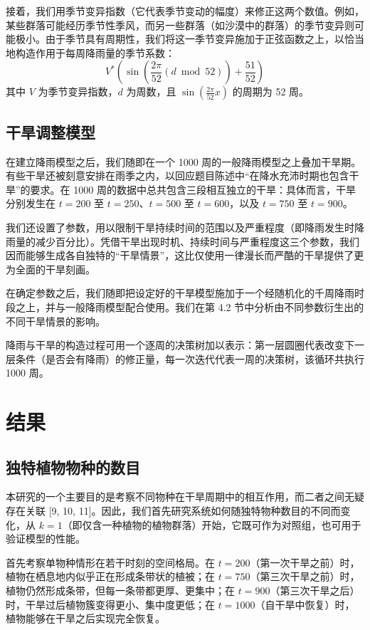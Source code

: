 \documentclass[11pt,a4paper]{ctexart}
\begin{document}
接着，我们用季节变异指数（它代表季节变动的幅度）来修正这两个数值。例如，某些群落可能经历季节性季风，而另一些群落（如沙漠中的群落）的季节变异则可能极小。由于季节具有周期性，我们将这一季节变异施加于正弦函数之上，以恰当地构造作用于每周降雨量的季节系数：
\[
V^{*}\left(\sin\left(\frac{2\pi}{52}\left(d \bmod 52\right)\right) + \frac{51}{52}\right)
\]
其中 $V$ 为季节变异指数，$d$ 为周数，且 $\sin\left(\frac{2\pi}{52}x\right)$ 的周期为 52 周。

\subsection{干旱调整模型}

在建立降雨模型之后，我们随即在一个 1000 周的一般降雨模型之上叠加干旱期。有些干旱还被刻意安排在雨季之内，以回应题目陈述中“在降水充沛时期也包含干旱”的要求。在 1000 周的数据中总共包含三段相互独立的干旱：具体而言，干旱分别发生在 $t=200$ 至 $t=250$、$t=500$ 至 $t=600$，以及 $t=750$ 至 $t=900$。

我们还设置了参数，用以限制干旱持续时间的范围以及严重程度（即降雨发生时降雨量的减少百分比）。凭借干旱出现时机、持续时间与严重程度这三个参数，我们因而能够生成各自独特的“干旱情景”，这比仅使用一律漫长而严酷的干旱提供了更为全面的干旱刻画。

在确定参数之后，我们随即把设定好的干旱模型施加于一个经随机化的千周降雨时段之上，并与一般降雨模型配合使用。我们在第 4.2 节中分析由不同参数衍生出的不同干旱情景的影响。

降雨与干旱的构造过程可用一个逐周的决策树加以表示：第一层圆圈代表改变下一层条件（是否会有降雨）的修正量，每一次迭代代表一周的决策树，该循环共执行 1000 周。

\section{结果}

\subsection{独特植物物种的数目}

本研究的一个主要目的是考察不同物种在干旱周期中的相互作用，而二者之间无疑存在关联 [9, 10, 11]。因此，我们首先研究系统如何随独特物种数目的不同而变化，从 $k=1$（即仅含一种植物的植物群落）开始，它既可作为对照组，也可用于验证模型的性能。

首先考察单物种情形在若干时刻的空间格局。在 $t=200$（第一次干旱之前）时，植物在栖息地内似乎正在形成条带状的植被；在 $t=750$（第三次干旱之前）时，植物仍然形成条带，但每一条带都更厚、更集中；在 $t=900$（第三次干旱之后）时，干旱过后植物簇变得更小、集中度更低；在 $t=1000$（自干旱中恢复）时，植物能够在干旱之后实现完全恢复。
\end{document}
